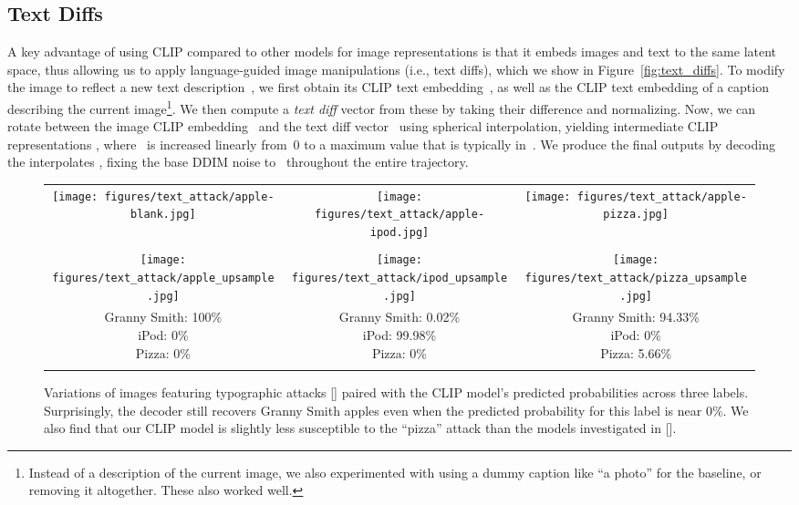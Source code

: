 \documentclass{article}
\newcommand{\shortcite}[1]{[\citenum{#1}]}
\begin{document}
\subsection{Text Diffs}
\label{sec:text_diffs}
A key advantage of using CLIP compared to other models for image representations is that it embeds images and text to the same latent space, thus allowing us to apply language-guided image manipulations (i.e., text diffs), which we show in Figure~\ref{fig:text_diffs}. To modify the image to reflect a new text description~, we first obtain its CLIP text embedding~, as well as the CLIP text embedding  of a caption describing the current image\footnote{Instead of a description of the current image, we also experimented with using a dummy caption like ``a photo'' for the baseline, or removing it altogether. These also worked well.}. We then compute a \textit{text diff} vector  from these by taking their difference and normalizing. Now, we can rotate between the image CLIP embedding~ and the text diff vector~ using spherical interpolation, yielding intermediate CLIP representations , where~ is increased linearly from~0 to a maximum value that is typically in~. We produce the final outputs by decoding the interpolates , fixing the base DDIM noise to~ throughout the entire trajectory.

\begin{figure*}[t]
    \centering
    \setlength{\tabcolsep}{4.0pt}
    \begin{tabular}{ccc}
        \texttt{[image: figures/text\_attack/apple-blank.jpg]} & 
        \texttt{[image: figures/text\_attack/apple-ipod.jpg]} &
        \texttt{[image: figures/text\_attack/apple-pizza.jpg]} \\
        \rule{0pt}{0.0pt} \\
        \texttt{[image: figures/text\_attack/apple\_upsample.jpg]} &
        \texttt{[image: figures/text\_attack/ipod\_upsample.jpg]} &
        \texttt{[image: figures/text\_attack/pizza\_upsample.jpg]} \\
        \makecell{Granny Smith: 100\% \\ iPod: 0\% \\ Pizza: 0\%} & \makecell{Granny Smith: 0.02\% \\ iPod: 99.98\% \\ Pizza: 0\%} & \makecell{Granny Smith: 94.33\% \\ iPod: 0\% \\ Pizza: 5.66\%} \\
        \rule{0pt}{0.5pt}
    \end{tabular}
    \vskip -0.1in
    \caption{\label{fig:variation_adversarial} Variations of images featuring typographic attacks \shortcite{multimodalneurons} paired with the CLIP model's predicted probabilities across three labels. Surprisingly, the decoder still recovers Granny Smith apples even when the predicted probability for this label is near 0\%. We also find that our CLIP model is slightly less susceptible to the ``pizza'' attack than the models investigated in \shortcite{multimodalneurons}.}
    \vskip -0.1in
\end{figure*}
\end{document}
